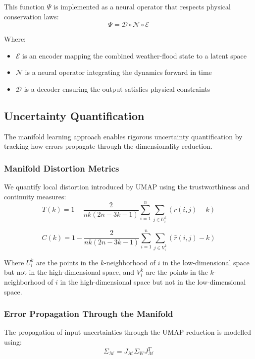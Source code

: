 \documentclass{article}
\begin{document}
This function $\Psi$ is implemented as a neural operator that respects physical conservation laws:
\begin{equation}
\Psi = \mathcal{D} \circ \mathcal{N} \circ \mathcal{E}
\end{equation}

Where:
\begin{itemize}
\item $\mathcal{E}$ is an encoder mapping the combined weather-flood state to a latent space
\item $\mathcal{N}$ is a neural operator integrating the dynamics forward in time
\item $\mathcal{D}$ is a decoder ensuring the output satisfies physical constraints
\end{itemize}

\subsection{Uncertainty Quantification}
The manifold learning approach enables rigorous uncertainty quantification by tracking how errors propagate through the dimensionality reduction.

\subsubsection{Manifold Distortion Metrics}
We quantify local distortion introduced by UMAP using the trustworthiness and continuity measures:
\begin{equation}
T(k) = 1 - \frac{2}{nk(2n-3k-1)}\sum_{i=1}^{n}\sum_{j \in U_i^k}(r(i,j) - k)
\end{equation}

\begin{equation}
C(k) = 1 - \frac{2}{nk(2n-3k-1)}\sum_{i=1}^{n}\sum_{j \in V_i^k}(\hat{r}(i,j) - k)
\end{equation}

Where $U_i^k$ are the points in the $k$-neighborhood of $i$ in the low-dimensional space but not in the high-dimensional space, and $V_i^k$ are the points in the $k$-neighborhood of $i$ in the high-dimensional space but not in the low-dimensional space.

\subsubsection{Error Propagation Through the Manifold}
The propagation of input uncertainties through the UMAP reduction is modelled using:
\begin{equation}
\Sigma_{\mathcal{M}} = J_{\mathcal{M}} \Sigma_W J_{\mathcal{M}}^T
\end{equation}
\end{document}
